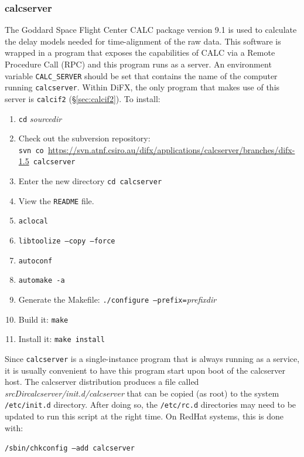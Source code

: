 
\subsubsection{calcserver} \label{sec:calcserver}

The Goddard Space Flight Center CALC package version 9.1 is used to calculate the delay models needed for time-alignment of the raw data.
This software is wrapped in a program that exposes the capabilities of CALC via a Remote Procedure Call (RPC) and this program runs as a server.
An environment variable {\tt CALC\_SERVER} should be set that contains the name of the computer running {\tt calcserver}.
Within DiFX, the only program that makes use of this server is {\tt calcif2} (\S\ref{sec:calcif2}).
To install:
\begin{enumerate}
\item {\tt cd} {\em sourcedir}
\item Check out the subversion repository: \\
{\tt svn co }\url{https://svn.atnf.csiro.au/difx/applications/calcserver/branches/difx-1.5}{\tt\ calcserver}
\item Enter the new directory {\tt cd calcserver}
\item View the {\tt README} file.
\item {\tt aclocal}
\item {\tt libtoolize --copy --force}
\item {\tt autoconf}
\item {\tt automake -a}
\item Generate the Makefile: {\tt ./configure --prefix=}{\em prefixdir}
\item Build it: {\tt make}
\item Install it: {\tt make install}
\end{enumerate}

Since {\tt calcserver} is a single-instance program that is always running as a service, it is usually convenient to have this program start upon boot of the calcserver host.
The calcserver distribution produces a file called {\em srcDir}{\em calcserver/init.d/calcserver} that can be copied (as root) to the system {\tt /etc/init.d} directory.
After doing so, the {\tt /etc/rc.d} directories may need to be updated to run this script at the right time.
On RedHat systems, this is done with:

\noindent
{\tt /sbin/chkconfig --add calcserver}








